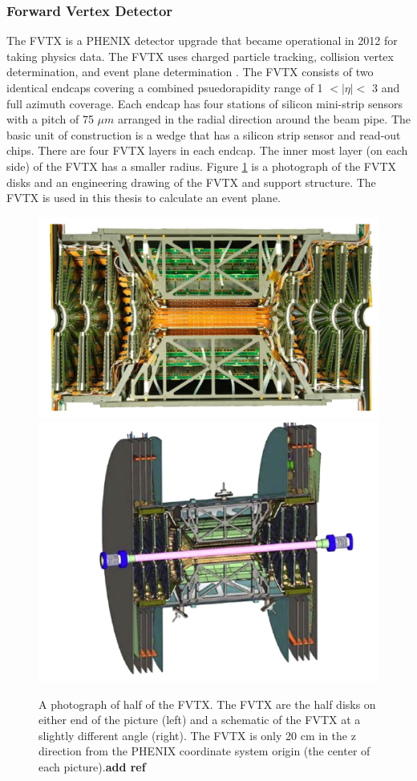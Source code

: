 \subsubsection{Forward Vertex Detector}
The FVTX is a PHENIX detector upgrade that became operational in 2012 for taking physics data. The FVTX uses charged particle tracking, collision vertex determination, and event plane determination \cite{Aidala201444}. The FVTX consists of two identical endcaps covering a combined psuedorapidity range of 1 $<|\eta|<$ 3 and full azimuth coverage. Each endcap has four stations of silicon mini-strip sensors with a pitch of 75 $\mu m$ arranged in the radial direction around the beam pipe. The basic unit of construction is a wedge that has a silicon strip sensor and read-out chips. There are four FVTX layers in each endcap. The inner most layer (on each side) of the FVTX has a smaller radius. Figure \ref{fig:fvtx_cutaway} is a photograph of the FVTX disks and an engineering drawing of the FVTX and support structure. The FVTX is used in this thesis to calculate an event plane.
\begin{figure}[h!]
\begin{center}
\includegraphics[width=0.45\linewidth]{figs/fvtx_cutaway.png}
\includegraphics[width=0.45\linewidth]{figs/fvtx_diagram.png}
\caption{A photograph of half of the FVTX. The FVTX are the half disks on either end of the picture (left) and a schematic of the FVTX at a slightly different angle (right). The FVTX is only 20 cm in the z direction from the PHENIX coordinate system origin (the center of each picture).\textbf{add ref}}
\label{fig:fvtx_cutaway}
\end{center}
\end{figure}
